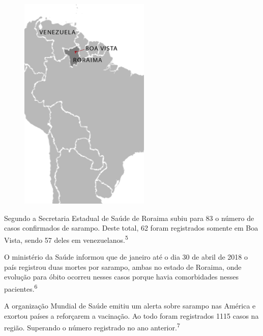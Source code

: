 \documentclass{article}
\begin{document}
{\begin{figure}
\centering
\includegraphics[width=.2\textwidth]{img_altera_4.png}%
\end{figure}

\par

\justifying
	Segundo a Secretaria Estadual de Saúde de Roraima subiu para 83 o número de casos confirmados de sarampo. Deste total, 62 foram registrados somente em Boa Vista, sendo 57 deles em venezuelanos.\textsuperscript{5}

	O ministério da Saúde informou que de janeiro até o dia 30 de abril de 2018 o país registrou duas mortes por sarampo, ambas no estado de Roraima, onde evolução para óbito ocorreu nesses casos porque havia comorbidades nesses pacientes.\textsuperscript{6}

	A organização Mundial de Saúde emitiu um alerta sobre sarampo nas América e exortou países a reforçarem a vacinação. Ao todo foram registrados 1115 casos na região. Superando o número registrado no ano anterior.\textsuperscript{7}
    
} %
\end{document}

